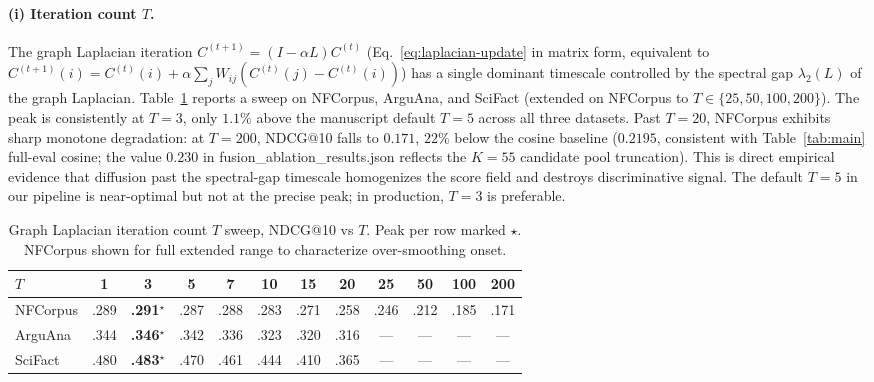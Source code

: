\documentclass[review,1p]{elsarticle}
\begin{document}
\paragraph{(i) Iteration count $T$.} The graph Laplacian iteration $C^{(t+1)} = (I - \alpha L) C^{(t)}$ (Eq.~\ref{eq:laplacian-update} in matrix form, equivalent to $C^{(t+1)}(i) = C^{(t)}(i) + \alpha \sum_j W_{ij} (C^{(t)}(j) - C^{(t)}(i))$) has a single dominant timescale controlled by the spectral gap $\lambda_2(L)$ of the graph Laplacian. Table~\ref{tab:T-sweep} reports a sweep on NFCorpus, ArguAna, and SciFact (extended on NFCorpus to $T \in \{25, 50, 100, 200\}$). The peak is consistently at $T=3$, only $1.1\%$ above the manuscript default $T=5$ across all three datasets. Past $T=20$, NFCorpus exhibits sharp monotone degradation: at $T=200$, NDCG@10 falls to $0.171$, $22\%$ below the cosine baseline ($0.2195$, consistent with Table~\ref{tab:main} full-eval cosine; the value $0.230$ in fusion\_ablation\_results.json reflects the $K=55$ candidate pool truncation). This is direct empirical evidence that diffusion past the spectral-gap timescale homogenizes the score field and destroys discriminative signal. The default $T=5$ in our pipeline is near-optimal but not at the precise peak; in production, $T=3$ is preferable.

\begin{table}[h]
\centering
\small
\caption{Graph Laplacian iteration count $T$ sweep, NDCG@10 vs $T$. Peak per row marked $\star$. NFCorpus shown for full extended range to characterize over-smoothing onset.}
\label{tab:T-sweep}
\begin{tabular}{lccccccccccc}
\toprule
$T$ & 1 & 3 & 5 & 7 & 10 & 15 & 20 & 25 & 50 & 100 & 200 \\
\midrule
NFCorpus & .289 & \textbf{.291}$^\star$ & .287 & .288 & .283 & .271 & .258 & .246 & .212 & .185 & .171 \\
ArguAna & .344 & \textbf{.346}$^\star$ & .342 & .336 & .323 & .320 & .316 & --- & --- & --- & --- \\
SciFact & .480 & \textbf{.483}$^\star$ & .470 & .461 & .444 & .410 & .365 & --- & --- & --- & --- \\
\bottomrule
\end{tabular}
\end{table}
\end{document}
